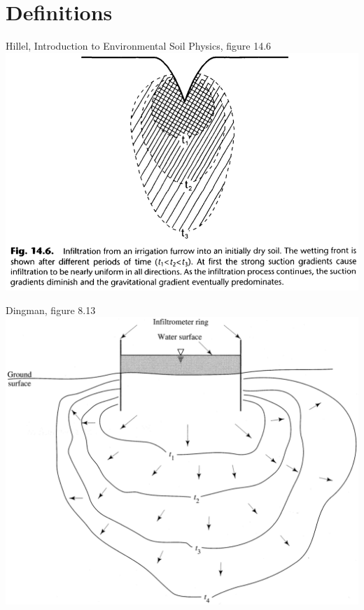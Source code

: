 \documentclass[
  letterpaper,
  DIV=11,
  numbers=noendperiod]{scrreprt}
\begin{document}
\hypertarget{definitions}{%
\section{Definitions}\label{definitions}}

Hillel, Introduction to Environmental Soil Physics, figure 14.6
\includegraphics{archive/figures/hillel-introduction-to-environmental-soil-physics-figure14.6.png}

Dingman, figure 8.13
\includegraphics{archive/figures/dingman-figure8.13.png}
\end{document}
